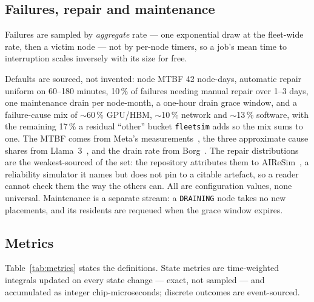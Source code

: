 \subsection{Failures, repair and maintenance}

Failures are sampled by \emph{aggregate} rate --- one exponential draw at the
fleet-wide rate, then a victim node --- not by per-node timers, so a job's mean
time to interruption scales inversely with its size for free.

Defaults are sourced, not invented: node MTBF 42 node-days, automatic repair
uniform on 60--180 minutes, 10\,\% of failures needing manual repair over 1--3
days, one maintenance drain per node-month, a one-hour drain grace window, and a
failure-cause mix of $\sim$60\,\% GPU/HBM, $\sim$10\,\% network and
$\sim$13\,\% software, with the remaining 17\,\% a residual ``other'' bucket
\texttt{fleetsim} adds so the mix sums to one. The MTBF comes from Meta's
measurements~\cite{metareliability2024}, the three approximate cause shares from
Llama~3~\cite{llama3}, and the drain rate from Borg~\cite{borg2015}. The repair
distributions are the weakest-sourced of the set: the repository attributes them
to AIReSim~\cite{aireesim}, a reliability simulator it names but does not pin to
a citable artefact, so a reader cannot check them the way the others can. All
are configuration values, none universal. Maintenance is a separate stream: a
\texttt{DRAINING} node takes no new placements, and its residents are requeued
when the grace window expires.

\subsection{Metrics}

Table~\ref{tab:metrics} states the definitions. State metrics are time-weighted
integrals updated on every state change --- exact, not sampled --- and
accumulated as integer chip-microseconds; discrete outcomes are event-sourced.

